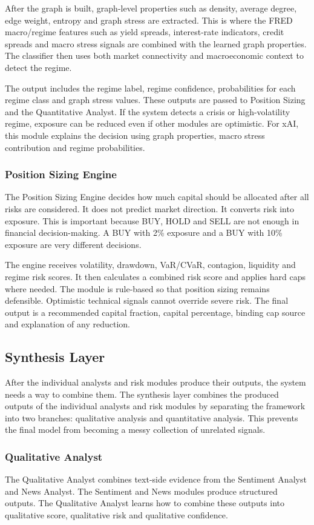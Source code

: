 \documentclass[conference]{IEEEtran}
\begin{document}
After the graph is built, graph-level properties such as density, average degree, edge weight, entropy and graph stress are extracted. This is where the FRED macro/regime features such as yield spreads, interest-rate indicators, credit spreads and macro stress signals are combined with the learned graph properties. The classifier then uses both market connectivity and macroeconomic context to detect the regime.

The output includes the regime label, regime confidence, probabilities for each regime class and graph stress values. These outputs are passed to Position Sizing and the Quantitative Analyst. If the system detects a crisis or high-volatility regime, exposure can be reduced even if other modules are optimistic. For xAI, this module explains the decision using graph properties, macro stress contribution and regime probabilities.
\subsubsection{Position Sizing Engine}
The Position Sizing Engine decides how much capital should be allocated after all risks are considered. It does not predict market direction. It converts risk into exposure. This is important because BUY, HOLD and SELL are not enough in financial decision-making. A BUY with 2\% exposure and a BUY with 10\% exposure are very different decisions.

The engine receives volatility, drawdown, VaR/CVaR, contagion, liquidity and regime risk scores. It then calculates a combined risk score and applies hard caps where needed. The module is rule-based so that position sizing remains defensible. Optimistic technical signals cannot override severe risk. The final output is a recommended capital fraction, capital percentage, binding cap source and explanation of any reduction.

\subsection{Synthesis Layer}
After the individual analysts and risk modules produce their outputs, the system needs a way to combine them. The synthesis layer combines the produced outputs of the individual analysts and risk modules by separating the framework into two branches: qualitative analysis and quantitative analysis. This prevents the final model from becoming a messy collection of unrelated signals. 

\subsubsection{Qualitative Analyst}
The Qualitative Analyst combines text-side evidence from the Sentiment Analyst and News Analyst. The Sentiment and News modules produce structured outputs. The Qualitative Analyst learns how to combine these outputs into qualitative score, qualitative risk and qualitative confidence.
\end{document}
